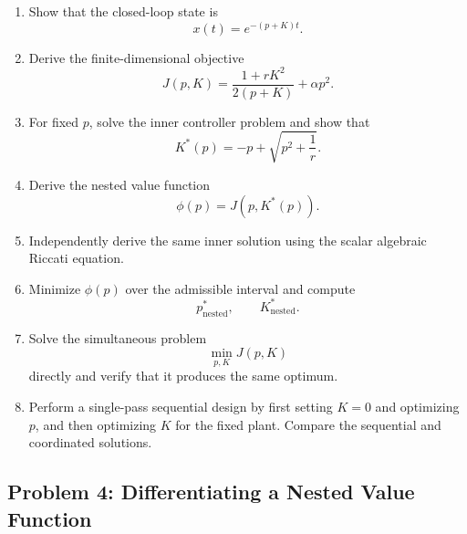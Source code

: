 \begin{enumerate}
    \item Show that the closed-loop state is
    \begin{equation}
    x(t)=e^{-(p+K)t}.
    \end{equation}

    \item Derive the finite-dimensional objective
    \begin{equation}
    J(p,K)
    =
    \frac{1+rK^2}{2(p+K)}
    +
    \alpha p^2.
    \end{equation}

    \item For fixed $p$, solve the inner controller problem and show that
    \begin{equation}
    K^*(p)
    =
    -p+\sqrt{p^2+\frac{1}{r}}.
    \end{equation}

    \item Derive the nested value function
    \begin{equation}
    \phi(p)=J\left(p,K^*(p)\right).
    \end{equation}

    \item Independently derive the same inner solution using the scalar
    algebraic Riccati equation.

    \item Minimize $\phi(p)$ over the admissible interval and compute
    \begin{equation}
    p^*_{\mathrm{nested}},
    \qquad
    K^*_{\mathrm{nested}}.
    \end{equation}

    \item Solve the simultaneous problem
    \begin{equation}
    \min_{p,K}J(p,K)
    \end{equation}
    directly and verify that it produces the same optimum.

    \item Perform a single-pass sequential design by first setting $K=0$
    and optimizing $p$, and then optimizing $K$ for the fixed plant.
    Compare the sequential and coordinated solutions.
\end{enumerate}


\subsection*{Problem 4: Differentiating a Nested Value Function}

